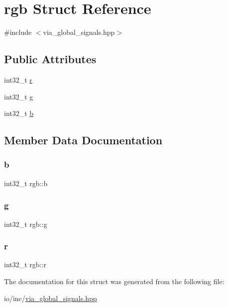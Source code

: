 \hypertarget{structrgb}{}\section{rgb Struct Reference}
\label{structrgb}


{\ttfamily \#include $<$via\+\_\+global\+\_\+signals.\+hpp$>$}

\subsection*{Public Attributes}
\begin{DoxyCompactItemize}
\item 
int32\+\_\+t \mbox{\hyperlink{structrgb_aa3881a894d4965c77f1877a565e765e9}{r}}
\item 
int32\+\_\+t \mbox{\hyperlink{structrgb_a252b453949d767d41a73f90bdfb51383}{g}}
\item 
int32\+\_\+t \mbox{\hyperlink{structrgb_a0182d00ed3f44b0b5576bfa693b635a1}{b}}
\end{DoxyCompactItemize}


\subsection{Member Data Documentation}
\mbox{\label{structrgb_a0182d00ed3f44b0b5576bfa693b635a1}} 
\subsubsection{\texorpdfstring{b}{b}}
{\footnotesize\ttfamily int32\+\_\+t rgb\+::b}

\mbox{\label{structrgb_a252b453949d767d41a73f90bdfb51383}} 
\subsubsection{\texorpdfstring{g}{g}}
{\footnotesize\ttfamily int32\+\_\+t rgb\+::g}

\mbox{\label{structrgb_aa3881a894d4965c77f1877a565e765e9}} 
\subsubsection{\texorpdfstring{r}{r}}
{\footnotesize\ttfamily int32\+\_\+t rgb\+::r}



The documentation for this struct was generated from the following file\+:\begin{DoxyCompactItemize}
\item 
io/inc/\mbox{\hyperlink{via__global__signals_8hpp}{via\+\_\+global\+\_\+signals.\+hpp}}\end{DoxyCompactItemize}
